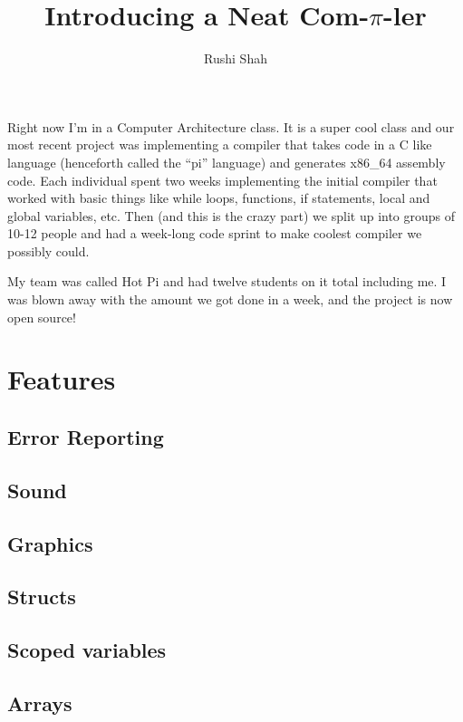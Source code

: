 \documentclass[12pt]{article}
\title{Introducing a Neat Com-$\pi$-ler}
\author{Rushi Shah}
\begin{document}
  \maketitle

    Right now I'm in a Computer Architecture class. It is a super cool class and our most recent project was implementing a compiler that takes code in a C like language (henceforth called the ``pi'' language) and generates x86\_64 assembly code. Each individual spent two weeks implementing the initial compiler that worked with basic things like while loops, functions, if statements, local and global variables, etc. Then (and this is the crazy part) we split up into groups of 10-12 people and had a week-long code sprint to make coolest compiler we possibly could. 

    My team was called Hot Pi and had twelve students on it total including me. I was blown away with the amount we got done in a week, and the project is now open source!

    \section{Features}

      \subsection{Error Reporting}

      \subsection{Sound}

      \subsection{Graphics}

      \subsection{Structs}

      \subsection{Scoped variables}

      \subsection{Arrays}
\end{document}
